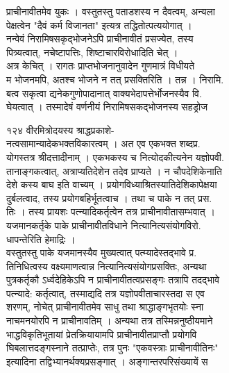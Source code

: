 \documentclass[11pt, openany]{book}
\begin{document}
{{{{{{{{{{{{{प्राचीनावीतमेव युकः । वस्तुतस्तु पताडशस्य न दैवत्वम्, अन्यला\\
पेक्षत्वेन "दैवं कर्म विजानता" इत्यत्र तद्धितोत्पत्ययोगात् ।\\
नन्वेवं निरामिषसकृद्भोजनेऽपि प्राचीनावीतं प्रसज्येत, तस्य\\
पित्र्यत्वात्, नचेष्टापत्तिः, शिष्टाचारविरोधादिति चेत् ।\\
अत्र केचित् । रागतः प्राप्तभोजनानुवादेन गुणमात्रं विधीयते\\
म भोजनमपि, अतश्च भोजने न तत् प्रसक्तिरिति । तन्न । निरामि.\\
बत्व सकृत्वा द्यनेकगुणोपादानात् वाक्यभेदापत्तेर्भोजनस्यैव वि.\\
घेयत्वात् । तस्मादेषं वर्णनीयं निरामिषसकद्भोजनस्य सहड्रोज

{१२४ }{वीरमित्रोदयस्य श्राद्धप्रकाशे-}{\\
नत्वसामान्यादेकभक्तविकारत्वम् । अत एव एकभक्त शब्दप्र.\\
योगस्तत्र श्रीदत्तादीनाम् । एकभकस्य च नित्योदकीत्यनेन यज्ञोपवी.\\
तानाङ्गकत्वात्, अत्राप्यतिदेशेन तदेव प्राप्यते । न चौपदेशिकेनाति\\
देशे कस्य बाघ इति वाच्यम् । प्रयोगविध्याश्रितस्यातिदेशिकापेक्षया\\
दुर्बलत्वाद, तस्य प्रयोगबहिर्भूतत्वाच । तथा च पाके न तत् प्रस.\\
तिः । तस्य प्रायशः पत्न्यादिकर्तृत्वेन तत्र प्राचीनावीतासम्भवात् ।\\
यजमानकर्तृके पाके प्राचीनावीतविधाने नित्यानित्यसंयोगविरो.\\
धापन्तेरिति हेमाद्रिः ।\\
वस्तुतस्तु पाके यजमानस्यैव मुख्यत्वात् पत्म्यादेस्तद्भावे प्र.\\
तिनिधित्वस्य वक्ष्यमाणत्वान्न नित्यानित्यसंयोगप्रसक्तिः, अन्यथा\\
पुत्रकर्तृकौ ऽर्ध्वदेहिकेऽपि न प्राचीनावीतत्वप्रसङ्गः तत्रापि तदद्भावे\\
पत्न्यादे: कर्तृत्वात्, तस्माद्यदि तत्र यज्ञोपवीताचारस्तदा स एव\\
शरणम्, नोचेत् प्राचीनावीतमेव साधु \textbar{} तथा श्राद्धाङ्गभृतयोः
स्ना\\
नाचमनयोरपि न प्राचीनावतिम् । अन्यथा तत्र तस्मिन्ननुष्ठीयमाने\\
भाद्धविकृतिभूतायां प्रेतक्रियायामपि प्राचीनावीतप्राप्तौ प्रयोगवि\\
घिबलात्तदङ्गस्नाने तत्प्राप्तेः, तत्र पुनः "एकवस्त्राः प्राचीनावीतिनः"\\
इत्यादिना तद्विभ्यानर्थक्यप्रसङ्गात् । अङ्गान्तरपरिसंख्यायें स\\
}}}}}}}}}}}}}}
\end{document}
